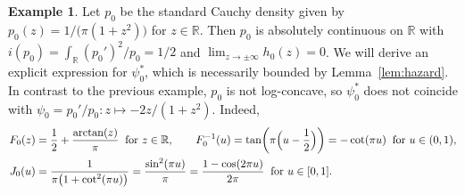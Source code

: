 \documentclass[a4paper]{article}
\newcommand{\R}{\mathbb{R}}
\theoremstyle{definition}
\newtheorem{example}[theorem]{Example}
\begin{document}
\begin{example}
\label{ex:cauchy}
Let $p_0$ be the standard Cauchy density given by $p_0(z) = 1/\bigl(\pi(1 + z^2)\bigr)$ for $z \in \R$. Then $p_0$ is absolutely continuous on $\R$ with $i(p_0) = \int_\R (p_0')^2/p_0 = 1/2$ and $\lim_{z \to \pm\infty} h_0(z) = 0$. We will derive an explicit expression for $\psi_0^*$, which is necessarily bounded by Lemma~\ref{lem:hazard}. In contrast to the previous example, $p_0$ is not log-concave, so $\psi_0^*$ does not coincide with $\psi_0 = p_0'/p_0 \colon z \mapsto -2z/(1 + z^2)$. Indeed, 
\begin{align*}
F_0(z) &= \frac{1}{2} + \frac{\arctan(z)}{\pi} \;\;\text{for }z \in \R, \qquad F_0^{-1}(u) = \tan\biggl(\pi\Bigl(u - \frac{1}{2}\Bigr)\biggr) = -\cot(\pi u) \;\;\text{for }u \in (0,1), \\
J_0(u) &= \frac{1}{\pi\bigl(1 + \cot^2(\pi u)\bigr)} = \frac{\sin^2(\pi u)}{\pi} = \frac{1 - \cos(2\pi u)}{2\pi} \;\;\text{for }u \in [0,1].
\end{align*}


\end{example}
\end{document}
